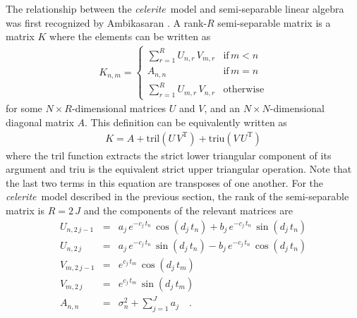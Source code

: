 \documentclass[manuscript, letterpaper]{aastex6}
\newcommand{\celeriteterm}{\emph{celerite}}
\newcommand{\eqlabel}[1]{\label{eq:#1}}
\newcommand{\T}{\ensuremath{\mathrm{T}}}
\begin{document}
The relationship between the \celeriteterm\ model and semi-separable linear
algebra was first recognized by Ambikasaran \citep{Ambikasaran:2015}.
A rank-$R$ semi-separable matrix is a matrix $K$ where the elements can be
written as
\begin{eqnarray}
K_{n,m} = \left\{\begin{array}{ll}
    \sum_{r=1}^R U_{n,r}\,V_{m,r} & \mathrm{if}\,m<n \\
    A_{n,n} & \mathrm{if}\,m=n \\
    \sum_{r=1}^R U_{m,r}\,V_{n,r} & \mathrm{otherwise}
\end{array}\right.
\end{eqnarray}
for some $N \times R$-dimensional matrices $U$ and $V$, and an $N \times
N$-dimensional diagonal matrix $A$.
This definition can be equivalently written as
\begin{eqnarray}\eqlabel{semi-sep}
K = A + \mathrm{tril}(U\,V^\T) + \mathrm{triu}(V\,U^\T)
\end{eqnarray}
where the $\mathrm{tril}$ function extracts the strict lower triangular
component of its argument and $\mathrm{triu}$ is the equivalent strict upper
triangular operation.  Note that the last two terms in this equation are
transposes of one another.
For the \celeriteterm\ model described in the previous section, the rank of
the semi-separable matrix is $R = 2\,J$ and the components of the relevant
matrices are
\begin{eqnarray}
U_{n,2\,j-1} &=& a_j\,e^{-c_j\,t_n}\,\cos(d_j\,t_n) +
    b_j\,e^{-c_j\,t_n}\,\sin(d_j\,t_n) \\
U_{n,2\,j} &=& a_j\,e^{-c_j\,t_n}\,\sin(d_j\,t_n) -
    b_j\,e^{-c_j\,t_n}\,\cos(d_j\,t_n) \\
V_{m,2\,j-1} &=& e^{c_j\,t_m}\,\cos(d_j\,t_m) \\
V_{m,2\,j} &=& e^{c_j\,t_m}\,\sin(d_j\,t_m) \\
A_{n,n} &=& \sigma_n^2 + \sum_{j=1}^J a_j \quad.
\end{eqnarray}
\end{document}
